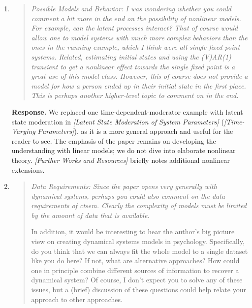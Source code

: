 \documentclass[11pt]{article}
\newcommand{\response}{\textbf{Response.} }
\newcommand{\secit}[1]{\textit{[#1]}}
\newenvironment{reviewerpoint}{\begin{quote}\itshape}{\end{quote}}
\begin{document}
\begin{enumerate}[label=\textbf{Reviewer 1, Major Point \arabic*.}]
\response We have focused on making the tutorial easier to navigate, including stronger sectioning, a more explicit roadmap in \secit{Scope and Outline}, and guidance on which sections suit different readers (see our response to Editor Comment 1).
We also condensed repetitive code-heavy passages, plots, and explanations where they did not add substantially to the conceptual progression.
\item

\begin{reviewerpoint}
Possible Models and Behavior: I was wondering whether you could comment a bit more in the end on the possibility of nonlinear models.
For example, can the latent processes interact?
That of course would allow one to model systems with much more complex behaviors than the ones in the running example, which I think were all single fixed point systems.
Related, estimating initial states and using the (V)AR(1) transient to get a nonlinear effect towards the single fixed point is a great use of this model class.
However, this of course does not provide a model for how a person ended up in their initial state in the first place.
This is perhaps another higher-level topic to comment on in the end.
\end{reviewerpoint}

\response We replaced one time-dependent-moderator example with latent state moderation in \secit{Latent State Moderation of System Parameters} (\secit{Time-Varying Parameters}), as it is a more general approach and useful for the reader to see.
The emphasis of the paper remains on developing the understanding with linear models; we do not dive into elaborate nonlinear theory.
\secit{Further Works and Resources} briefly notes additional nonlinear extensions.
\item

\begin{reviewerpoint}
Data Requirements: Since the paper opens very generally with dynamical systems, perhaps you could also comment on the data requirements of ctsem.
Clearly the complexity of models must be limited by the amount of data that is available.

In addition, it would be interesting to hear the author's big picture view on creating dynamical systems models in psychology.
Specifically, do you think that we can always fit the whole model to a single dataset like you do here?
If not, what are alternative approaches?
How could one in principle combine different sources of information to recover a dynamical system?
Of course, I don't expect you to solve any of these issues, but a (brief) discussion of these questions could help relate your approach to other approaches.
\end{reviewerpoint}


\end{enumerate}
\end{document}
